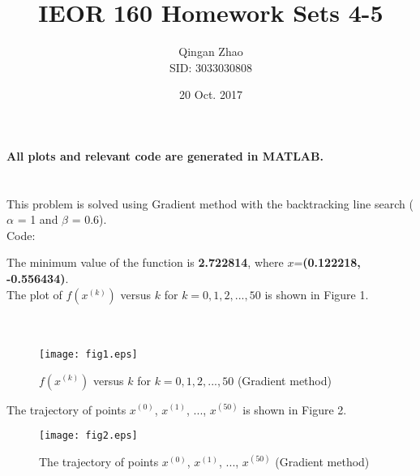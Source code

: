 \documentclass[12pt]{article}
\title{IEOR 160 Homework Sets 4-5}
\date{20 Oct. 2017}
\author{Qingan Zhao \\ SID: 3033030808}
\begin{document}
\maketitle
\newcommand{\ud}{\mathrm d} %
\renewcommand\theequation{\arabic{equation}}
\renewcommand{\figurename}{Fig.}
\renewcommand\thesection{Problem \arabic{section}}
\renewcommand\thesubsection{\alph{subsection} )}

\begin{large}
\noindent\textbf{All plots and relevant code are generated in MATLAB.}
\end{large}

\section{}

This problem is solved using Gradient method with the backtracking line search ($\alpha$ = 1 and $\beta$ = 0.6).\\

\noindent Code:



\bigskip\noindent The minimum value of the function is \textbf{2.722814}, where $x$=\textbf{(0.122218, -0.556434)}.\\

\noindent The plot of $f(x^{(k)})$ versus $k$ for $k=0,1,2,...,50$ is shown in Figure 1.\\\\\\

\begin{figure}[!htbp]
	\centering
	\texttt{[image: fig1.eps]}      
	\caption{$f(x^{(k)})$ versus $k$ for $k=0,1,2,...,50$ (Gradient method)}
\end{figure}

\noindent The trajectory of points $x^{(0)}$, $x^{(1)}$, ..., $x^{(50)}$ is shown in Figure 2.

\begin{figure}[!htbp]
	\centering
	\texttt{[image: fig2.eps]}      
	\caption{The trajectory of points $x^{(0)}$, $x^{(1)}$, ..., $x^{(50)}$ (Gradient method)}
\end{figure}

\section{}
\end{document}
